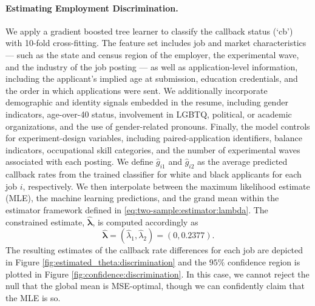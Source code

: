 \documentclass[12pt,letterpaper]{article}
\begin{document}
\paragraph{Estimating Employment Discrimination.} 
We apply a gradient boosted tree learner to classify the callback status (`cb') with 10-fold cross-fitting. 
The feature set includes job and market characteristics --- such as the state and census region of the employer, the experimental wave, and the industry of the job posting --- as well as application-level information, including the applicant’s implied age at submission, education credentials, and the order in which applications were sent. We additionally incorporate demographic and identity signals embedded in the resume, including gender indicators, age-over-40 status, involvement in LGBTQ, political, or academic organizations, and the use of gender-related pronouns. Finally, the model controls for experiment-design variables, including paired-application identifiers, balance indicators, occupational skill categories, and the number of experimental waves associated with each posting. We define $\hat{g}_{i1}$ and $\hat{g}_{i2}$ as the average predicted callback rates from the trained classifier for white and black applicants for each job $i$, respectively. We then interpolate between the maximum likelihood estimate (MLE), the machine learning predictions, and the grand mean within the estimator framework defined in \eqref{eq:two-sample:estimator:lambda}. 
The constrained estimate, $\hat{\boldsymbol\lambda}$, is computed accordingly as 
\begin{equation}\label{eq:lambda:two-sample:discrimination}
    \hat{\boldsymbol\lambda}=(\hat{\lambda}_1,\hat{\lambda}_2)=(0,0.2377).
\end{equation}
The resulting estimates of the callback rate differences for each job are depicted in Figure \ref{fig:estimated_theta:discrimination}  and the $95\%$ confidence region is plotted in Figure \ref{fig:confidence:discrimination}. In this case, we cannot reject the null that the global mean is MSE-optimal, though we can confidently claim that the MLE is so.
\end{document}
